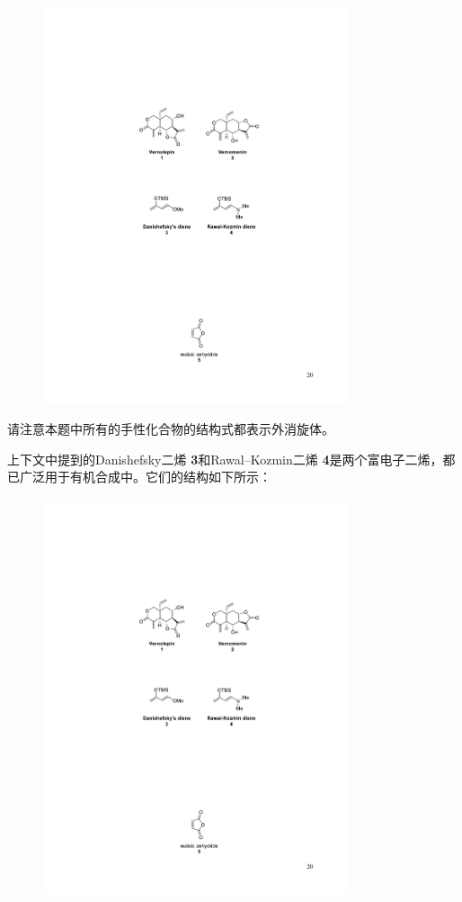 \begin{figure}[h]
	\centering
	\includegraphics[width=9cm]{./pic/t2-3.pdf}
\end{figure}

请注意本题中所有的手性化合物的结构式都表示外消旋体。
\newpage

上下文中提到的Danishefsky二烯 \textbf{3}和Rawal--Kozmin二烯 \textbf{4}是两个富电子二烯，都已广泛用于有机合成中。它们的结构如下所示：

\begin{figure}[h]
	\centering
	\includegraphics[width=9cm]{./pic/t2-4.pdf}
\end{figure}

